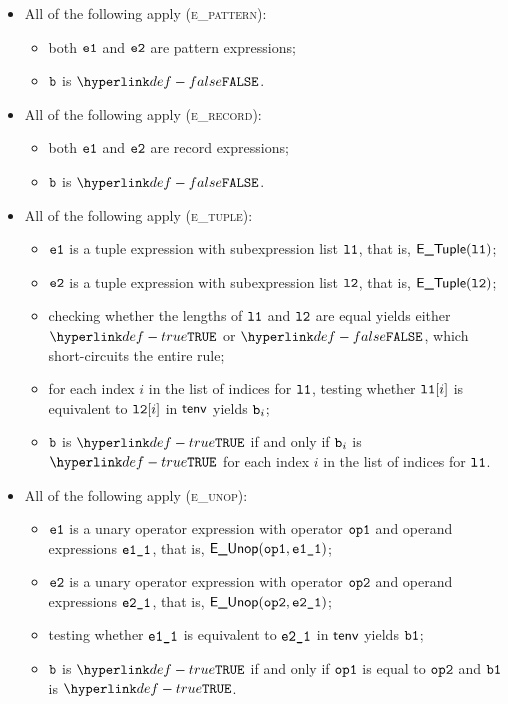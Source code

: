 \documentclass{book}
\newcommand\ProseOrTypeError[0]{\ProseTerminateAs{\TypeErrorConfig}}
\begin{document}
\begin{itemize}
  \item All of the following apply (\textsc{e\_pattern}):
  \begin{itemize}
    \item both $\texttt{e1}$ and $\texttt{e2}$ are pattern expressions;
    \item $\texttt{b}$ is $\False$.
  \end{itemize}

  \item All of the following apply (\textsc{e\_record}):
  \begin{itemize}
    \item both $\texttt{e1}$ and $\texttt{e2}$ are record expressions;
    \item $\texttt{b}$ is $\False$.
  \end{itemize}

  \item All of the following apply (\textsc{e\_tuple}):
  \begin{itemize}
    \item $\texttt{e1}$ is a tuple expression with subexpression list $\texttt{l1}$,
          that is, $\textsf{E\_Tuple}(\texttt{l1})$;
    \item $\texttt{e2}$ is a tuple expression with subexpression list $\texttt{l2}$,
          that is, $\textsf{E\_Tuple}(\texttt{l2})$;
    \item checking whether the lengths of $\texttt{l1}$ and $\texttt{l2}$ are equal yields either $\True$ or $\False$, which short-circuits
          the entire rule;
    \item for each index $i$ in the list of indices for $\texttt{l1}$, testing whether $\texttt{l1}[i]$ is equivalent to $\texttt{l2}[i]$
          in $\textsf{tenv}$ yields $\texttt{b}_i$\ProseOrTypeError;
    \item $\texttt{b}$ is $\True$ if and only if $\texttt{b}_i$ is $\True$ for each index $i$ in the list of indices for $\texttt{l1}$.
  \end{itemize}

  \item All of the following apply (\textsc{e\_unop}):
  \begin{itemize}
    \item $\texttt{e1}$ is a unary operator expression with operator $\texttt{op1}$ and operand expressions $\texttt{e1\_1}$,
          that is, $\textsf{E\_Unop}(\texttt{op1}, \texttt{e1\_1})$;
    \item $\texttt{e2}$ is a unary operator expression with operator $\texttt{op2}$ and operand expressions $\texttt{e2\_1}$,
          that is, $\textsf{E\_Unop}(\texttt{op2}, \texttt{e2\_1})$;
    \item testing whether $\texttt{e1\_1}$ is equivalent to $\texttt{e2\_1}$ in $\textsf{tenv}$ yields $\texttt{b1}$;
    \item $\texttt{b}$ is $\True$ if and only if $\texttt{op1}$ is equal to $\texttt{op2}$ and $\texttt{b1}$ is $\True$.
  \end{itemize}


\end{itemize}
\end{document}
